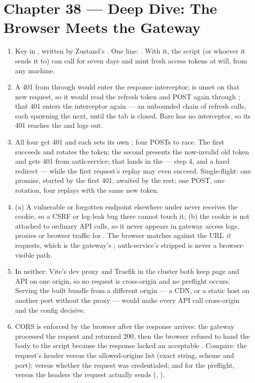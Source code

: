 \section*{Chapter 38 --- Deep Dive: The Browser Meets the Gateway}
\begin{enumerate}
  \item Key  in , written by
  Zustand's . One line:
  .
  With it, the script (or whoever it sends it to) can call
   for seven days and mint fresh access tokens
  at will, from any machine.
  \item A 401 from  through  would enter
  the response interceptor;  is unset on that new
  request, so it would read the refresh token and POST 
  again through ; that 401 enters the interceptor
  again --- an unbounded chain of refresh calls, each spawning the
  next, until the tab is closed. Bare  has no interceptor,
  so its 401 reaches the  and logs out.
  \item All four get 401 and each sets its own ; four
  POSTs to  race. The first succeeds and rotates the
  token; the second presents the now-invalid old token and gets 401
  from auth-service; that lands in the  --- step 4,
   and a hard redirect --- while the first request's
  replay may even succeed. Single-flight: one promise, started by the
  first 401, awaited by the rest; one POST, one rotation, four
  replays with the same new token.
  \item (a) A vulnerable or forgotten endpoint elsewhere under
   never receives the cookie, so a CSRF or log-leak bug
  there cannot touch it; (b) the cookie is not attached to ordinary
  API calls, so it never appears in gateway access logs, proxies or
  browser traffic for . The browser matches
   against the URL \emph{it} requests, which is the
  gateway's ; auth-service's stripped
   is never a browser-visible path.
  \item In neither: Vite's dev proxy and Traefik in the cluster both
  keep page and API on one origin, so no request is cross-origin and
  no preflight occurs. Serving the built bundle from a different
  origin --- a CDN, or a static host on another port without the
  proxy --- would make every API call cross-origin and the config
  decisive.
  \item CORS is enforced by the browser after the response arrives:
  the gateway processed the request and returned 200, then the browser
  refused to hand the body to the script because the response lacked
  an acceptable . Compare: the
  request's  header versus the allowed-origins list (exact
  string, scheme and port); 
  versus whether the request was credentialed; and for the preflight,
   versus the headers the request
  actually sends (, ).
\end{enumerate}
